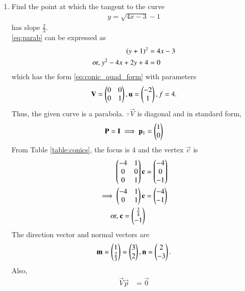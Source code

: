 \renewcommand{\theequation}{\theenumi}
\begin{enumerate}[label=\thesection.\arabic*.,ref=\thesection.\theenumi]
\item 
Find the point at which the tangent to the curve 
\begin{align}
y = \sqrt{4x-3}-1
\label{eq:parab}
\end{align}
has slope $\frac{2}{3}$.
\\
\solution \eqref{eq:parab} can be expressed as
\begin{align}
\left(y+1\right)^2 &= 4x-3
\\
\text{or, } y^2  -4x + 2y+ 4 &= 0
\label{eq:parab_twovar}
\end{align}
which has the form \eqref{eq:conic_quad_form} with parameters
\begin{align}
\mathbf{V} = \begin{pmatrix}0 & 0\\0 & 1\end{pmatrix}, \mathbf{u} = \begin{pmatrix}-2\\1\end{pmatrix}, f = 4.
\label{eq:parab_twovar_params}
\end{align}
Thus, the given curve is a parabola.  $\because \vec{V}$ is diagonal and in standard form,
\begin{align}
\mathbf{P} = \mathbf{I} \implies \mathbf{p}_1 = \begin{pmatrix}1\\0\end{pmatrix}
\label{eq:parab_ex1_eig}
\end{align}
From Table \ref{table:conics}, the 
focus is 4
and the vertex $\vec{c}$ is
\begin{align}
\begin{pmatrix} -4 & 1 \\ 0 & 0 \\ 0 & 1\end{pmatrix}\mathbf{c} &= \begin{pmatrix}-4 \\ 0\\-1\end{pmatrix} 
\\
\implies 
\begin{pmatrix} -4 & 1 \\  0 & 1\end{pmatrix}\mathbf{c} &= \begin{pmatrix}-4 \\ -1\end{pmatrix} 
\\
\text{or, } \mathbf{c} = \begin{pmatrix}\frac{3}{4}\\-1\end{pmatrix}
\end{align}
The direction vector and normal vectors are
\begin{align}
\mathbf{m} = \begin{pmatrix}1 \\ \frac{2}{3}\end{pmatrix} = \begin{pmatrix}3\\2\end{pmatrix}, \mathbf{n} = \begin{pmatrix}2\\-3\end{pmatrix}.
\label{eq:parab_twovar_mn}
\end{align}
Also, 
\begin{align}
\vec{V}\vec{p} &= \vec{0}

\end{align}
\end{enumerate}
